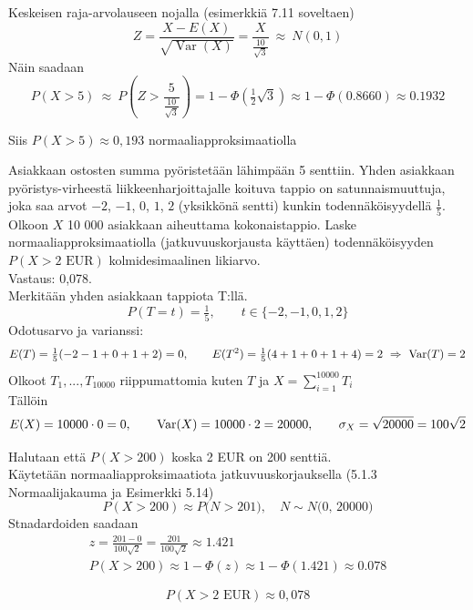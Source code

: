 \documentclass[12pt,a4paper]{article}
\begin{document}
Keskeisen raja-arvolauseen nojalla (esimerkkiä 7.11 soveltaen)
\[
Z=\frac{X-E(X)}{\sqrt{\operatorname{Var}(X)}}=\frac{X}{\frac{10}{\sqrt{3}}}\ \approx\ N(0,1)
\]
Näin saadaan
\[
P(X>5)\ \approx\ P\!\left(
    Z>\frac{5}{\frac{10}{\sqrt{3}}}
    \right)
=1-\Phi\!\left(\tfrac12\sqrt{3}\right)
\approx 1-\Phi(0.8660)
\approx 0.1932
\]

Siis \(P(X>5)\approx 0{,}193\) normaaliapproksimaatiolla





\pagebreak
{}
Asiakkaan ostosten summa pyöristetään lähimpään 5 senttiin. Yhden asiakkaan pyöristys-virheestä liikkeenharjoittajalle koituva tappio on satunnaismuuttuja, joka saa arvot $-2$, $-1$, $0$, $1$, $2$ (yksikkönä sentti) kunkin todennäköisyydellä $\frac{1}{5}$. Olkoon $X$ 10 000 asiakkaan aiheuttama kokonaistappio. Laske normaaliapproksimaatiolla (jatkuvuuskorjausta käyttäen) todennäköisyyden $P(X>2\text{ EUR})$ kolmidesimaalinen likiarvo. \\

Vastaus: 0{,}078.\\


\medskip
Merkitään yhden asiakkaan tappiota T:llä.
\[
P(T=t)=\tfrac15,\qquad t\in\{-2,-1,0,1,2\}
\]
Odotusarvo ja varianssi:
\[
E(T)=\tfrac15(-2-1+0+1+2)=0,\qquad
E(T^2)=\tfrac15(4+1+0+1+4)=2\ \Rightarrow\ \operatorname{Var}(T)=2
\]
Olkoot $T_1,...,T_{10000}$ riippumattomia kuten $T$ ja $X=\sum_{i=1}^{10000}T_i$\\
Tällöin
\[
E(X)=10000\cdot 0=0,\qquad
\operatorname{Var}(X)=10000\cdot 2=20000,\qquad
\sigma_X=\sqrt{20000}=100\sqrt2
\]
\vspace{0.4cm}

Halutaan että $P(X>200)$ koska 2 EUR on 200 senttiä.\\
Käytetään normaaliapproksimaatiota
jatkuvuuskorjauksella (5.1.3 Normaalijakauma ja Esimerkki 5.14)
\[
P(X>200)\approx P\bigl(N>201\bigr),\quad N\sim N\!\bigl(0,\,20000\bigr)
\]
Stnadardoiden saadaan
\[
\begin{aligned}
z=\frac{201-0}{100\sqrt2}=\frac{201}{100\sqrt2}\approx 1.421\\
P(X>200)\approx 1-\Phi(z)\approx 1-\Phi(1.421)\approx 0.078
\end{aligned}
\]
\vspace{0.4cm}

\[
P(X>2\text{ EUR})\approx 0{,}078
\]
\end{document}
